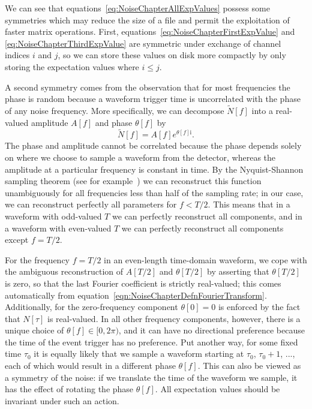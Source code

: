 We can see that equations~\ref{eq:NoiseChapterAllExpValues} possess some symmetries which may reduce the size of a file and permit the exploitation of faster matrix operations.  First, equations~\ref{eq:NoiseChapterFirstExpValue} and \ref{eq:NoiseChapterThirdExpValue} are symmetric under exchange of channel indices $i$ and $j$, so we can store these values on disk more compactly by only storing the expectation values where $i \leq j$.

A second symmetry comes from the observation that for most frequencies the phase is random because a waveform trigger time is uncorrelated with the phase of any noise frequency.  More specifically, we can decompose $\widetilde{N}[f]$ into a real-valued amplitude $A[f]$ and phase $\theta[f]$ by
\begin{equation}
\widetilde{N}[f] = A[f]e^{\theta[f] \mathrm{i}}.
\end{equation}
The phase and amplitude cannot be correlated because the phase depends solely on where we choose to sample a waveform from the detector, whereas the amplitude at a particular frequency is constant in time.  By the Nyquist-Shannon sampling theorem (see for example~\cite{659497}) we can reconstruct this function unambiguously for all frequencies less than half of the sampling rate; in our case, we can reconstruct perfectly all parameters for $f < T/2$.  This means that in a waveform with odd-valued $T$ we can perfectly reconstruct all components, and in a waveform with even-valued $T$ we can perfectly reconstruct all components except $f = T/2$.

For the frequency $f = T/2$ in an even-length time-domain waveform, we cope with the ambiguous reconstruction of $A[T/2]$ and $\theta[T/2]$ by asserting that $\theta[T/2]$ is zero, so that the last Fourier coefficient is strictly real-valued; this comes automatically from equation~\ref{eqn:NoiseChapterDefnFourierTransform}.  Additionally, for the zero-frequency component $\theta[0] = 0$ is enforced by the fact that $N[\tau]$ is real-valued.  In all other frequency components, however, there is a unique choice of $\theta[f] \in [0,2\pi)$, and it can have no directional preference because the time of the event trigger has no preference.  Put another way, for some fixed time $\tau_0$ it is equally likely that we sample a waveform starting at $\tau_0$, $\tau_0 + 1$, ..., each of which would result in a different phase $\theta[f]$.  This can also be viewed as a symmetry of the noise: if we translate the time of the waveform we sample, it has the effect of rotating the phase $\theta[f]$.  All expectation values should be invariant under such an action.

